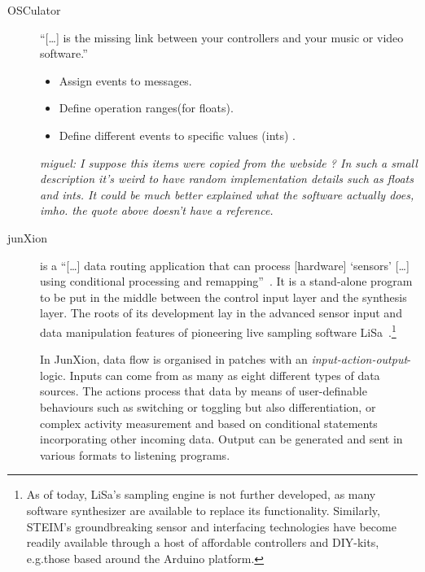 \documentclass{article}
\begin{document}
\begin{description}
	\item[OSCulator] 
		\enquote{[\dots] is the missing link between your controllers and your music or video software.}
		\begin{itemize}
		\item Assign events to messages.
		\item Define operation ranges(for floats).
		\item Define different events to specific values (ints) .
		\end{itemize}
		\emph{miguel:  I suppose this items were copied from the webside ? In such a small description it's weird to have random implementation details such as floats and ints. It could be much better explained what the software actually does, imho. the quote above doesn't have a reference.}
	\item[junXion] 
		is a \enquote{[\dots] data routing application that can process [hardware] `sensors' [\dots] using conditional processing and remapping}~\cite{-jun}. 
		It is a stand-alone program to be put in the middle between the control input layer and the synthesis layer.
The roots of its development lay in the advanced sensor input and data manipulation features of pioneering live sampling software LiSa~\cite{-jun}.\footnote{As of today, LiSa's sampling engine is not further developed, as many software synthesizer are available to replace its functionality. 
Similarly, STEIM's groundbreaking sensor and interfacing technologies have become readily available through a host of affordable controllers and DIY-kits, e.g.those based around the Arduino platform.}

In JunXion, data flow is organised in patches with an \emph{input-action-output}-logic. 
Inputs can come from as many as eight different types of data sources.
The actions process that data by means of user-definable behaviours such as switching or toggling but also differentiation, or complex activity measurement and based on conditional statements incorporating other incoming data. 
Output can be generated and sent in various formats to listening programs.


\end{description}
\end{document}
